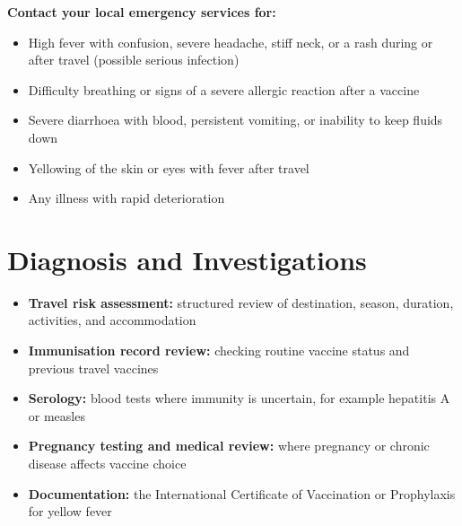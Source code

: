 \textbf{Contact your local emergency services for:}
\begin{itemize}
    \item High fever with confusion, severe headache, stiff neck, or a rash during or after travel (possible serious infection)
    \item Difficulty breathing or signs of a severe allergic reaction after a vaccine
    \item Severe diarrhoea with blood, persistent vomiting, or inability to keep fluids down
    \item Yellowing of the skin or eyes with fever after travel
    \item Any illness with rapid deterioration
\end{itemize}

\section*{Diagnosis and Investigations}
\begin{itemize}
    \item \textbf{Travel risk assessment:} structured review of destination, season, duration, activities, and accommodation
    \item \textbf{Immunisation record review:} checking routine vaccine status and previous travel vaccines
    \item \textbf{Serology:} blood tests where immunity is uncertain, for example hepatitis A or measles
    \item \textbf{Pregnancy testing and medical review:} where pregnancy or chronic disease affects vaccine choice
    \item \textbf{Documentation:} the International Certificate of Vaccination or Prophylaxis for yellow fever
\end{itemize}


